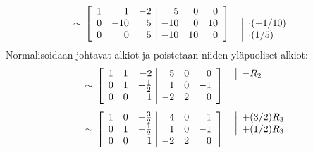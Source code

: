 \documentclass[11pt,a4paper]{amsart}
\begin{document}
\begin{solution}
\begin{enumerate}[label=(\alph*), leftmargin=*]
\[\begin{aligned}
          \\[1ex]
          &\sim{}
          \left[
            \begin{array}{rrr|rrr}
              1 & 1 & -2 & 5 & 0 & 0 \\
              0 & -10 & 5 & -10 & 0 & 10 \\
              0 & 0 & 5 & -10 & 10 & 0
            \end{array}
          \right]
          \quad
          \begin{array}{@{}l@{}}
            {} \\
            \smash{\rowop{\cdot(-1/10)}} \\
            \smash{\rowop{\cdot(1/5)}}
          \end{array}
        \end{aligned}
      \]
      Normalisoidaan johtavat alkiot ja poistetaan niiden yläpuoliset
      alkiot:
      \[
        \begin{aligned}
          &\sim{}
          \left[
            \begin{array}{rrr|rrr}
              1 & 1 & -2 & 5 & 0 & 0 \\
              0 & 1 & -\frac12 & 1 & 0 & -1 \\
              0 & 0 & 1 & -2 & 2 & 0
            \end{array}
          \right]
          \quad
          \begin{array}{@{}l@{}}
            \smash{\rowop{-R_2}} \\
            \vphantom{\frac12} \\
            {}
          \end{array}
          \\[1ex]
          &\sim{}
          \left[
            \begin{array}{rrr|rrr}
              1 & 0 & -\frac32 & 4 & 0 & 1 \\
              0 & 1 & -\frac12 & 1 & 0 & -1 \\
              0 & 0 & 1 & -2 & 2 & 0
            \end{array}
          \right]
          \quad
          \begin{array}{@{}l@{}}
            \vphantom{\frac32}\smash{\rowop{+(3/2)R_3}} \\
            \vphantom{\frac12}\smash{\rowop{+(1/2)R_3}} \\
            {}
          \end{array}
          \\[1ex]

\end{aligned}\]
\end{enumerate}
\end{solution}
\end{document}
